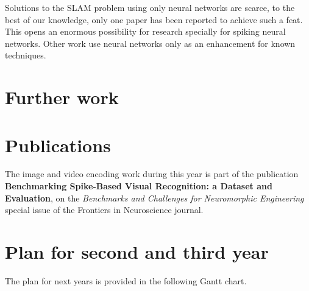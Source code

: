 


Solutions to the SLAM problem using only neural networks are scarce, to the best of our knowledge, only one paper has been reported to achieve such a feat. This opens an enormous possibility for research specially for spiking neural networks. Other work use neural networks only as an enhancement for known techniques.

\section{Further work}


\section{Publications}
The image and video encoding work during this year is part of the publication \textbf{Benchmarking Spike-Based Visual Recognition: a Dataset and Evaluation}, on the \emph{Benchmarks and Challenges for Neuromorphic Engineering} special issue of the Frontiers in Neuroscience journal.



%

\section{Plan for second and third year}
%
The plan for next years is provided in the following Gantt chart.
\newpage

